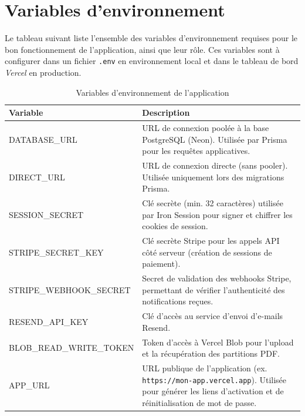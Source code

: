 \documentclass{article}
\begin{document}
\newpage

\section{Variables d'environnement}

Le tableau suivant liste l'ensemble des variables d'environnement requises pour le
bon fonctionnement de l'application, ainsi que leur rôle. Ces variables sont à
configurer dans un fichier \texttt{.env} en environnement local et dans le tableau
de bord \textit{Vercel} en production.

\begin{table}[H]
\centering
\renewcommand{\arraystretch}{1.4}
\begin{tabular}{>{\ttfamily}p{5.5cm} p{8.5cm}}
\toprule
\textbf{Variable} & \textbf{Description} \\
\midrule
DATABASE\_URL      & URL de connexion poolée à la base PostgreSQL (Neon). Utilisée par Prisma pour les requêtes applicatives. \\
DIRECT\_URL        & URL de connexion directe (sans pooler). Utilisée uniquement lors des migrations Prisma. \\
SESSION\_SECRET    & Clé secrète (min. 32 caractères) utilisée par Iron Session pour signer et chiffrer les cookies de session. \\
STRIPE\_SECRET\_KEY      & Clé secrète Stripe pour les appels API côté serveur (création de sessions de paiement). \\
STRIPE\_WEBHOOK\_SECRET  & Secret de validation des webhooks Stripe, permettant de vérifier l'authenticité des notifications reçues. \\
RESEND\_API\_KEY   & Clé d'accès au service d'envoi d'e-mails Resend. \\
BLOB\_READ\_WRITE\_TOKEN  & Token d'accès à Vercel Blob pour l'upload et la récupération des partitions PDF. \\
APP\_URL           & URL publique de l'application (ex. \texttt{https://mon-app.vercel.app}). Utilisée pour générer les liens d'activation et de réinitialisation de mot de passe. \\
\bottomrule
\end{tabular}
\caption{Variables d'environnement de l'application}
\end{table}

\newpage

\end{document}
